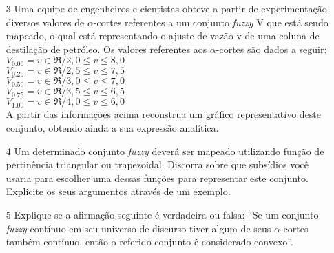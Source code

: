 \documentclass{report}
\begin{document}
\begin{enumerate}
\item[3] Uma equipe de engenheiros e cientistas obteve a partir de experimentação diversos valores de
$\alpha$-cortes referentes a um conjunto \emph{fuzzy} V que está sendo mapeado, o qual está representando o
ajuste de vazão v de uma coluna de destilação de petróleo. Os valores referentes aos $\alpha$-cortes são
dados a seguir:\\
$V_{0.00} = {v \in \Re / 2,0 \leq v \leq 8,0}$\\
$V_{0.25} = {v \in \Re / 2,5 \leq v \leq 7,5}$\\
$V_{0.50} = {v \in \Re / 3,0 \leq v \leq 7,0}$\\
$V_{0.75} = {v \in \Re / 3,5 \leq v \leq 6,5}$\\
$V_{1.00} = {v \in \Re / 4,0 \leq v \leq 6,0}$\\
A partir das informações acima reconstrua um gráfico representativo deste conjunto, obtendo
ainda a sua expressão analítica.


\item[4] Um determinado conjunto \emph{fuzzy} deverá ser mapeado utilizando função de pertinência
triangular ou trapezoidal. Discorra sobre que subsídios você usaria para escolher uma dessas
funções para representar este conjunto. Explicite os seus argumentos através de um exemplo.


\item[5] Explique se a afirmação seguinte é verdadeira ou falsa: “Se um conjunto \emph{fuzzy} contínuo em
seu universo de discurso tiver algum de seus $\alpha$-cortes também contínuo, então o referido
conjunto é considerado convexo”.

\end{enumerate}
\end{document}

